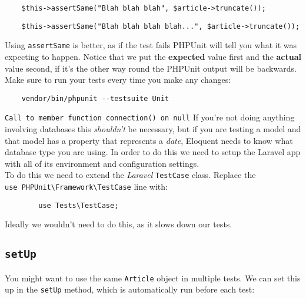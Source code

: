 \begin{verbatim}
    $this->assertSame("Blah blah blah", $article->truncate());
\end{verbatim}

\begin{verbatim}
    $this->assertSame("Blah blah blah blah...", $article->truncate());
\end{verbatim}

Using \texttt{assertSame} is better, as if the test fails PHPUnit will tell you what it was expecting to happen. Notice that we put the \textbf{expected} value first and the \textbf{actual} value second, if it's the other way round the PHPUnit output will be backwards.
\\

Make sure to run your tests every time you make any changes:

\begin{verbatim}
    vendor/bin/phpunit --testsuite Unit
\end{verbatim}


\begin{infobox}{\texttt{Call to member function connection() on null}}
    If you're not doing anything involving databases this \textit{shouldn't} be necessary, but if you are testing a model and that model has a property that represents a \textit{date}, Eloquent needs to know what database type you are using. In order to do this we need to setup the Laravel app with all of its environment and configuration settings.
    \\

    To do this we need to extend the \textit{Laravel} \texttt{TestCase} class. Replace the \\ \texttt{use PHPUnit\textbackslash{}Framework\textbackslash{}TestCase} line with:

    \begin{verbatim}
        use Tests\TestCase;
    \end{verbatim}

    Ideally we wouldn't need to do this, as it slows down our tests.
\end{infobox}



\subsection{\texttt{setUp}}

You might want to use the same \texttt{Article} object in multiple tests. We can set this up in the \texttt{setUp} method, which is automatically run before each test:

